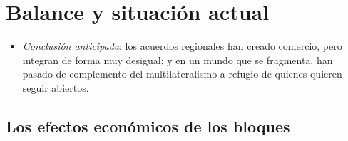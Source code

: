 \documentclass[11pt]{article}
\begin{document}
\section{Balance y situación actual}\label{sec:actual}

\begin{itemize}
\item \emph{Conclusión anticipada}: los acuerdos regionales han creado comercio, pero integran de forma muy desigual; y en un mundo que se fragmenta, han pasado de complemento del multilateralismo a refugio de quienes quieren seguir abiertos.
\end{itemize}

\subsection{Los efectos económicos de los bloques}\label{sec:balance}
\end{document}
